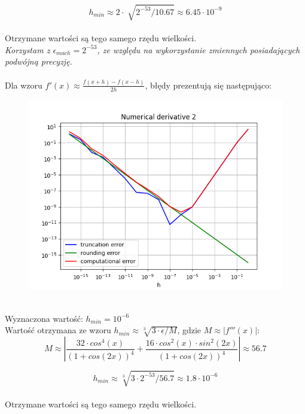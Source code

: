 \documentclass{article}
\begin{document}
$$h_{min} \approx 2\cdot\sqrt[]{2^{-53}/10.67}
\approx 6.45 \cdot 10^{-9}$$
\\
Otrzymane wartości są tego samego rzędu wielkości. \\
\textit{Korzystam z $\epsilon_{mach}=2^{-53}$,
 ze względu na wykorzystanie zmiennych posiadających podwójną precyzję.}
\\\\
Dla wzoru $f'(x)\approx\frac{f(x+h)-f(x-h)}{2h}$, błędy prezentują się następująco:
\begin{figure}[ht!]
\includegraphics[width=\linewidth]{figures/numerical_derivative_2.png}
\end{figure}
\\
Wyznaczona wartość: $h_{min} = 10^{-6}$ \\
Wartość otrzymana ze wzoru $h_{min} \approx \sqrt[3]{3\cdot\epsilon/M}$,
gdzie $M \approx \left|f'''(x)\right|$: \\
$$M\approx \left|\frac{32\cdot cos^4(x)}{(1 + cos(2 x))^4} + \frac{16\cdot cos^2(x)\cdot sin^2(2 x)}{(1 + cos(2 x))^4}\right|
\approx 56.7$$

$$h_{min} \approx \sqrt[3]{3\cdot2^{-53}/56.7}
\approx 1.8 \cdot 10^{-6}$$
\\
Otrzymane wartości są tego samego rzędu wielkości.  \\
\end{document}
